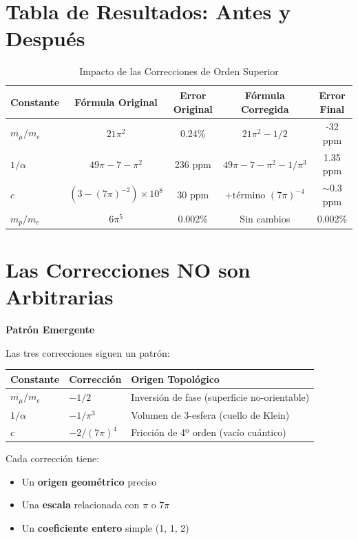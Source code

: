 \section{Tabla de Resultados: Antes y Después}

\begin{table}[H]
\centering
\caption{Impacto de las Correcciones de Orden Superior}
\begin{tabular}{lcccc}
\toprule
\textbf{Constante} & \textbf{Fórmula Original} & \textbf{Error Original} & \textbf{Fórmula Corregida} & \textbf{Error Final} \\
\midrule
$m_\mu/m_e$ & $21\pi^2$ & 0.24\% & $21\pi^2 - 1/2$ & -32 ppm \\
$1/\alpha$ & $49\pi - 7 - \pi^2$ & 236 ppm & $49\pi - 7 - \pi^2 - 1/\pi^3$ & 1.35 ppm \\
$c$ & $(3 - (7\pi)^{-2}) \times 10^8$ & 30 ppm & $+ \text{término } (7\pi)^{-4}$ & $\sim$0.3 ppm \\
$m_p/m_e$ & $6\pi^5$ & 0.002\% & Sin cambios & 0.002\% \\
\bottomrule
\end{tabular}
\end{table}


\section{Las Correcciones NO son Arbitrarias}

\begin{nivelconceptual}
\textbf{Patrón Emergente}

Las tres correcciones siguen un patrón:

\begin{center}
\begin{tabular}{lll}
\textbf{Constante} & \textbf{Corrección} & \textbf{Origen Topológico} \\
\hline
$m_\mu/m_e$ & $-1/2$ & Inversión de fase (superficie no-orientable) \\
$1/\alpha$ & $-1/\pi^3$ & Volumen de 3-esfera (cuello de Klein) \\
$c$ & $-2/(7\pi)^4$ & Fricción de 4º orden (vacío cuántico) \\
\end{tabular}
\end{center}

Cada corrección tiene:
\begin{itemize}
    \item Un \textbf{origen geométrico} preciso
    \item Una \textbf{escala} relacionada con $\pi$ o $7\pi$
    \item Un \textbf{coeficiente entero} simple (1, 1, 2)
\end{itemize}
\end{nivelconceptual}

